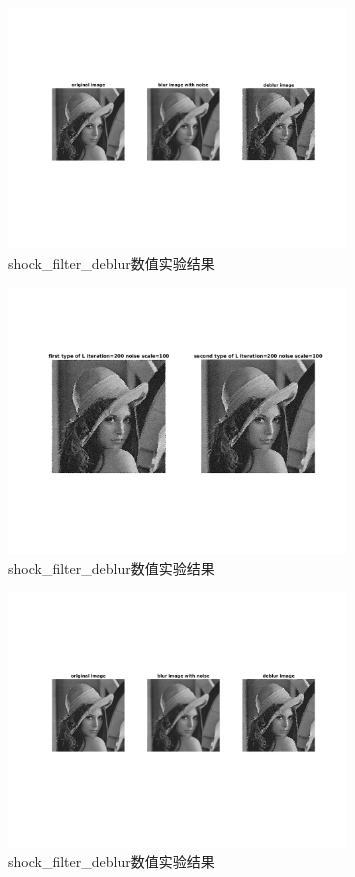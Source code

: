 \documentclass[a4paper, UTF8]{ctexrep}
\begin{document}
				\begin{figure}[htbp!]
					\centering
					\includegraphics[width=0.8\textwidth]{hw2_fig7.png}
					\caption{shock\_filter\_deblur数值实验结果}
					\label{}
				\end{figure}
				\begin{figure}[htbp!]
					\centering
					\includegraphics[width=0.8\textwidth]{hw2_fig8.png}
					\caption{shock\_filter\_deblur数值实验结果}
					\label{}
				\end{figure}
				\begin{figure}[htbp!]
					\centering
					\includegraphics[width=0.8\textwidth]{hw2_fig9.png}
					\caption{shock\_filter\_deblur数值实验结果}
					\label{}
				\end{figure}
\end{document}
